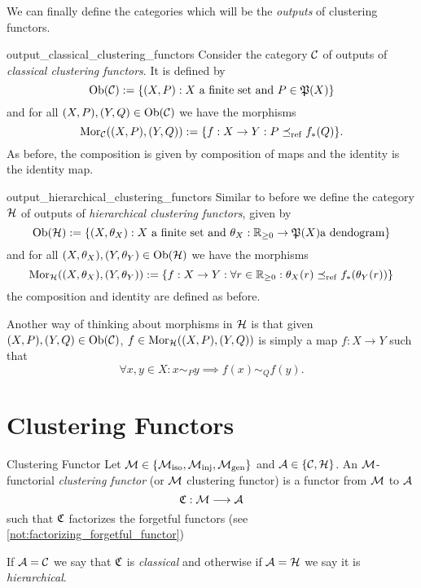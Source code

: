 We can finally define the categories which will be the \emph{outputs} of clustering functors.

\begin{definition}{}{output_classical_clustering_functors}
Consider the category $\mathcal{C}$ of outputs of \emph{classical clustering functors}. It is defined by
\begin{equation*}
    \mathrm {Ob}(\mathcal{C}) := \{(X, P): X \text{ a finite set and } P \in \mathfrak{P}(X)\}
\end{equation*}
and for all $(X,P), (Y,Q) \in \mathrm {Ob}(\mathcal{C})$ we have the morphisms
\begin{equation*}
    \mathrm {Mor}_{\mathcal{C}}((X,P), (Y,Q)) := \{f: X \to Y: P \preceq_\mathrm{ref} f_*(Q)\}.
\end{equation*}
As before, the composition is given by composition of maps and the identity is the identity map.
\end{definition}

\begin{definition}{}{output_hierarchical_clustering_functors}
Similar to before we define the category $\mathcal{H}$ of outputs of \emph{hierarchical clustering functors}, given by
\begin{equation*}
    \mathrm {Ob}(\mathcal{H}) := \{(X, \theta_X): X \text{ a finite set and } \theta_X: \mathbb R_{\geq0} \to \mathfrak{P}(X) \text{a dendogram}\}
\end{equation*}
and for all $(X, \theta_X), (Y, \theta_Y) \in \mathrm {Ob}(\mathcal{H})$ we have the morphisms
\begin{equation*}
    \mathrm {Mor}_{\mathcal{H}}((X, \theta_X), (Y,\theta_Y)) :=
    \left\{f: X \to Y: \forall r \in \mathbb R_{\geq0}: \theta_X(r) \preceq_\mathrm{ref} f_*(\theta_Y(r)) \right\}
\end{equation*}
the composition and identity are defined as before.
\end{definition}

Another way of thinking about morphisms in $\mathcal{H}$ is that given $(X,P), (Y,Q) \in \mathrm {Ob}(\mathcal{C})$, $f \in \mathrm {Mor}_{\mathcal{H}}((X,P), (Y,Q))$ is simply a map $f: X \to Y$ such that
$$
\forall x,y \in X: x \sim_P y \implies f(x) \sim_Q f(y).
$$

\section{Clustering Functors}
\begin{definition}{Clustering Functor}{}
Let $\mathcal{M} \in \{{\mathcal{M}_\mathrm{iso}}, {\mathcal{M}_\mathrm{inj}}, {\mathcal{M}_\mathrm{gen}}\}$ and $\mathcal{A} \in \{\mathcal{C}, \mathcal{H}\}$. An $\mathcal{M}$-functorial \emph{clustering functor} (or $\mathcal{M}$ clustering functor) is a functor from $\mathcal{M}$ to $\mathcal{A}$
$$\mathfrak{C} : \mathcal{M} \longrightarrow \mathcal{A}$$
such that $\mathfrak{C}$ factorizes the forgetful functors (see \ref{not:factorizing_forgetful_functor}) \par

\medskip If $\mathcal{A} = \mathcal{C}$ we say that $\mathfrak{C}$ is \emph{classical} and otherwise if $\mathcal{A} = \mathcal{H}$ we say it is \emph{hierarchical}.
\end{definition}


